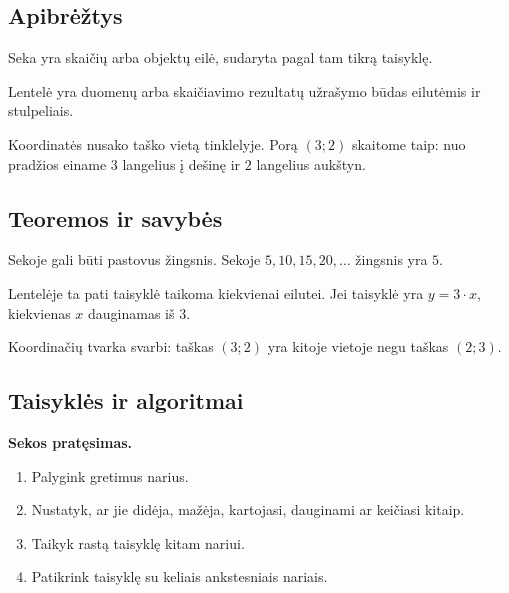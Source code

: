 \subsection{Apibrėžtys}

\begin{apibreztis}
Seka yra skaičių arba objektų eilė, sudaryta pagal tam tikrą taisyklę.
\end{apibreztis}

\begin{apibreztis}
Lentelė yra duomenų arba skaičiavimo rezultatų užrašymo būdas eilutėmis ir stulpeliais.
\end{apibreztis}

\begin{apibreztis}
Koordinatės nusako taško vietą tinklelyje. Porą \((3;2)\) skaitome taip: nuo pradžios einame \(3\) langelius į dešinę ir \(2\) langelius aukštyn.
\end{apibreztis}

\subsection{Teoremos ir savybės}

\begin{savybe}
Sekoje gali būti pastovus žingsnis. Sekoje \(5,10,15,20,\ldots\) žingsnis yra \(5\).
\end{savybe}

\begin{savybe}
Lentelėje ta pati taisyklė taikoma kiekvienai eilutei. Jei taisyklė yra \(y=3\cdot x\), kiekvienas \(x\) dauginamas iš \(3\).
\end{savybe}

\begin{savybe}
Koordinačių tvarka svarbi: taškas \((3;2)\) yra kitoje vietoje negu taškas \((2;3)\).
\end{savybe}

\subsection{Taisyklės ir algoritmai}

\textbf{Sekos pratęsimas.}
\begin{enumerate}[label=\arabic*.]
\item Palygink gretimus narius.
\item Nustatyk, ar jie didėja, mažėja, kartojasi, dauginami ar keičiasi kitaip.
\item Taikyk rastą taisyklę kitam nariui.
\item Patikrink taisyklę su keliais ankstesniais nariais.
\end{enumerate}

